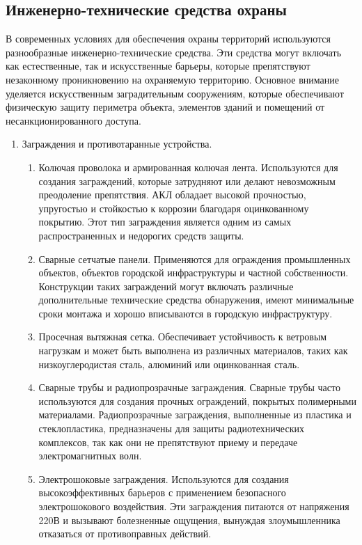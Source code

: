 \subsection{Инженерно-технические средства охраны}
В современных условиях для обеспечения охраны территорий используются разнообразные инженерно-технические средства. Эти средства могут включать как естественные, так и искусственные барьеры, которые препятствуют незаконному проникновению на охраняемую территорию. Основное внимание уделяется искусственным заградительным сооружениям, которые обеспечивают физическую защиту периметра объекта, элементов зданий и помещений от несанкционированного доступа.
\begin{enumerate}
    \item Заграждения и противотаранные устройства.
    \begin{enumerate}
        \item Колючая проволока и армированная колючая лента. Используются для создания заграждений, которые затрудняют или делают невозможным преодоление препятствия. АКЛ обладает высокой прочностью, упругостью и стойкостью к коррозии благодаря оцинкованному покрытию. Этот тип заграждения является одним из самых распространенных и недорогих средств защиты.
        \item Сварные сетчатые панели. Применяются для ограждения промышленных объектов, объектов городской инфраструктуры и частной собственности. Конструкции таких заграждений могут включать различные дополнительные технические средства обнаружения, имеют минимальные сроки монтажа и хорошо вписываются в городскую инфраструктуру.
        \item Просечная вытяжная сетка. Обеспечивает устойчивость к ветровым нагрузкам и может быть выполнена из различных материалов, таких как низкоуглеродистая сталь, алюминий или оцинкованная сталь.
        \item Сварные трубы и радиопрозрачные заграждения. Сварные трубы часто используются для создания прочных ограждений, покрытых полимерными материалами. Радиопрозрачные заграждения, выполненные из пластика и стеклопластика, предназначены для защиты радиотехнических комплексов, так как они не препятствуют приему и передаче электромагнитных волн.
        \item Электрошоковые заграждения. Используются для создания высокоэффективных барьеров с применением безопасного электрошокового воздействия. Эти заграждения питаются от напряжения 220В и вызывают болезненные ощущения, вынуждая злоумышленника отказаться от противоправных действий.

\end{enumerate}
\end{enumerate}
